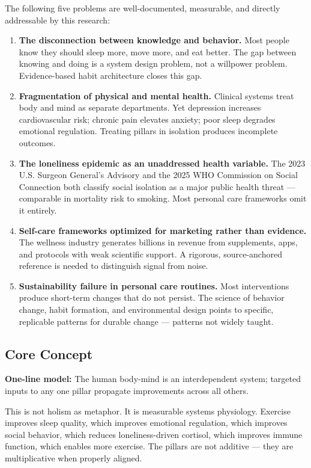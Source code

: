 \documentclass[11pt,letterpaper]{article}
\begin{document}
The following five problems are well-documented, measurable, and directly addressable by this research:

\begin{enumerate}[leftmargin=1.5em]
  \item \textbf{The disconnection between knowledge and behavior.} Most people know they should sleep more, move more, and eat better. The gap between knowing and doing is a system design problem, not a willpower problem. Evidence-based habit architecture closes this gap.

  \item \textbf{Fragmentation of physical and mental health.} Clinical systems treat body and mind as separate departments. Yet depression increases cardiovascular risk; chronic pain elevates anxiety; poor sleep degrades emotional regulation. Treating pillars in isolation produces incomplete outcomes.

  \item \textbf{The loneliness epidemic as an unaddressed health variable.} The 2023 U.S. Surgeon General's Advisory and the 2025 WHO Commission on Social Connection both classify social isolation as a major public health threat --- comparable in mortality risk to smoking. Most personal care frameworks omit it entirely.

  \item \textbf{Self-care frameworks optimized for marketing rather than evidence.} The wellness industry generates billions in revenue from supplements, apps, and protocols with weak scientific support. A rigorous, source-anchored reference is needed to distinguish signal from noise.

  \item \textbf{Sustainability failure in personal care routines.} Most interventions produce short-term changes that do not persist. The science of behavior change, habit formation, and environmental design points to specific, replicable patterns for durable change --- patterns not widely taught.
\end{enumerate}

\subsection{Core Concept}

\textbf{One-line model:} The human body-mind is an interdependent system; targeted inputs to any one pillar propagate improvements across all others.

This is not holism as metaphor. It is measurable systems physiology. Exercise improves sleep quality, which improves emotional regulation, which improves social behavior, which reduces loneliness-driven cortisol, which improves immune function, which enables more exercise. The pillars are not additive --- they are multiplicative when properly aligned.
\end{document}
